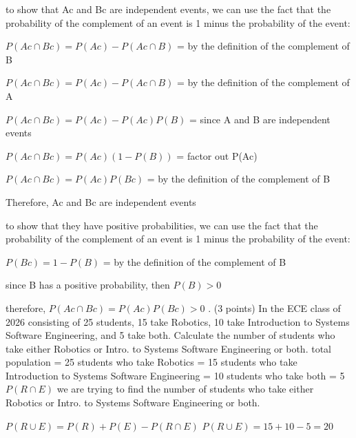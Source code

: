 \documentclass{article}
\begin{document}
to show that Ac and Bc are independent events, we can use the fact that the probability of the complement of an event is 1 minus the probability of the event:

\(P(Ac \cap Bc) = P(Ac) - P(Ac \cap B)\) = by the definition of the complement of B

\(P(Ac \cap Bc) = P(Ac) - P(Ac \cap B)\) = by the definition of the complement of A

\(P(Ac \cap Bc) = P(Ac) - P(Ac)P(B)\) = since A and B are independent events

\(P(Ac \cap Bc) = P(Ac)(1 - P(B))\) = factor out P(Ac)

\(P(Ac \cap Bc) = P(Ac)P(Bc)\) = by the definition of the complement of B

Therefore, Ac and Bc are independent events\newline\newline

to show that they have positive probabilities, we can use the fact that the probability of the complement of an event is 1 minus the probability of the event:

\(P(Bc) = 1 - P(B)\) = by the definition of the complement of B

since B has a positive probability, then \(P(B) > 0\)

therefore, \(P(Ac \cap Bc) = P(Ac)P(Bc) > 0\)   \newline {}. (3 points) In the ECE class of 2026 consisting of 25 students, 15 take Robotics, 10 take Introduction
to Systems Software Engineering, and 5 take both. Calculate the number of students who
take either Robotics or Intro. to Systems Software Engineering or both.\newline\newline
total population = 25\newline
students who take Robotics = 15\newline
students who take Introduction to Systems Software Engineering = 10\newline
students who take both = 5 \(P(R \cap E)\)\newline
we are trying to find the number of students who take either Robotics or Intro. to Systems Software Engineering or both.\newline

\(P(R \cup E ) = P(R) + P(E) - P(R \cap E)\)\newline
\(P(R \cup E ) = 15 + 10 - 5 = 20\)\newline
\end{document}
